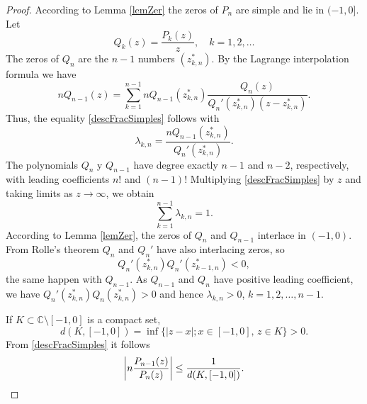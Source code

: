 \documentclass[10pt,a4paper]{amsart}
\begin{document}
\begin{proof} According to  Lemma \ref{lemZer} the zeros of $P_n$ are simple and lie in $(-1,0]$. Let
\[
Q_k(z)=\frac{P_k(z)}{z},\quad k=1,2,\ldots
\]
The zeros of $Q_n$ are the $n-1$ numbers $(z_{k,n}^*)$. By the Lagrange  interpolation formula we have
\[
nQ_{n-1}(z)=\sum_{k=1}^{n-1}nQ_{n-1}(z_{k,n}^*)\frac{Q_n(z)}{Q_n'(z_{k,n}^*)(z-z_{k,n}^*)}.
\]
Thus, the equality \eqref{descFracSimples} follows with
\[
\lambda_{k,n}=\frac{nQ_{n-1}(z_{k,n}^*)}{Q_n'(z_{k,n}^*)}.
\]
The polynomials $Q_n$ y $Q_{n-1}$ have degree exactly $n-1$ and $n-2$, respectively, with leading coefficients $n!$ and $(n-1)!$ Multiplying  \eqref{descFracSimples} by $z$ and taking limits as $z\to\infty$, we obtain
\[
\sum_{k=1}^{n-1}\lambda_{k,n}=1.
\]
According to  Lemma \ref{lemZer}, the zeros of $Q_n$ and $Q_{n-1}$  interlace in $(-1,0)$. From Rolle's theorem $Q_n$ and $Q_n'$ have also interlacing zeros, so 
\[
Q_n'(z_{k,n}^*)Q_n'(z_{k-1,n}^*)<0,
\]
the same happen with $Q_{n-1}$. As $Q_{n-1}$ and $Q_{n}$ have positive leading coefficient, we have
$Q_n'(z_{k,n}^*)Q_n(z_{k,n}^*)>0$ and hence $\lambda_{k,n}>0$, $k=1,2,\ldots,n-1.$

If $K\subset \mathbb{C}\setminus [-1,0]$ is a compact set, 
\[
d(K,[-1,0])=\inf\{|z-x|; x\in[-1,0],\, z\in K\}>0.
\]
From \eqref{descFracSimples} it follows
\[
\left|n\frac{P_{n-1}(z)}{P_n(z)}\right|\le \frac{1}{d(K,[-1,0])}.\qedhere
\]


\end{proof}
\end{document}
